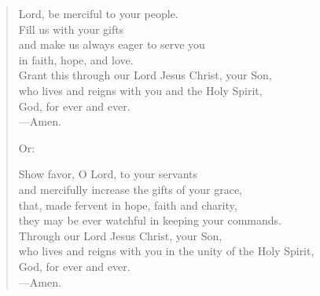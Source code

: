 \prayer

\setlength{\leftmargini}{\prayerleftmargini}

\begin{verse}
Lord, be merciful to your people.\\
Fill us with your gifts\\
and make us always eager to serve you\\
in faith, hope, and love.\\
Grant this through our Lord Jesus Christ, your Son,\\
who lives and reigns with you and the Holy Spirit,\\
God, for ever and ever.\\
{\color{red}---\thinspace}Amen.

{\color{red}Or:}

Show favor, O Lord, to your servants\\
and mercifully increase the gifts of your grace,\\
that, made fervent in hope, faith and charity,\\
they may be ever watchful in keeping your commands.\\
Through our Lord Jesus Christ, your Son,\\
who lives and reigns with you in the unity of the Holy Spirit,\\
God, for ever and ever.\\
{\color{red}---\thinspace}Amen.
\end{verse}

\setlength{\leftmargini}{\defleftmargini}